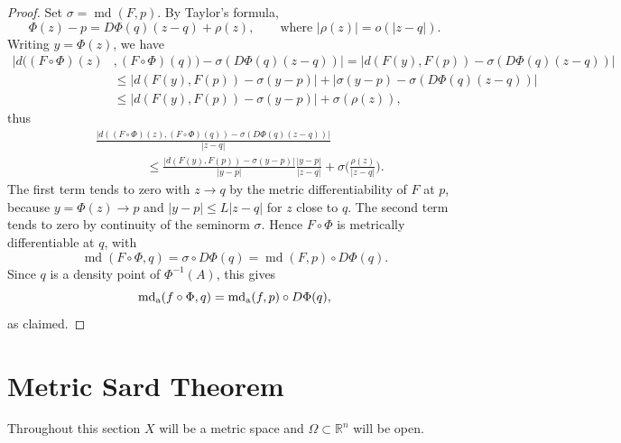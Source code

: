\documentclass[12pt,leqno]{amsart}
\theoremstyle{definition}
\newcommand{\bbbr}{\mathbb R}
\def\md{\operatorname{md}}
\def\apmd{\operatorname{md_{\rm a}}}
\numberwithin{theorem}{section} \numberwithin{equation}{section}
\begin{document}
\begin{proof}
Set $\sigma=\md(F,p)$. By Taylor's formula,
$$
\Phi(z)-p = D\Phi(q)(z-q)+\rho(z),
\qquad \text{where } |\rho(z)|=o(|z-q|).
$$
Writing $y=\Phi(z)$, we have
\begin{equation*}
\begin{split}
\left|\right. d((F\circ\Phi)(z)&,(F\circ\Phi)(q))
-\sigma(D\Phi(q)(z-q))\left.\right|  =
\left|
d(F(y),F(p))-\sigma(D\Phi(q)(z-q))
\right| \\
&\leq
\left|d(F(y),F(p))-\sigma(y-p)\right|+
\left|\sigma(y-p)-\sigma(D\Phi(q)(z-q))\right| \\
& \leq
\left|d(F(y),F(p))-\sigma(y-p)\right|+\sigma(\rho(z)),
\end{split}
\end{equation*}
thus
\begin{equation*}
\begin{split}
&\frac{\left|d((F\circ\Phi)(z),(F\circ\Phi)(q))
-\sigma(D\Phi(q)(z-q))
\right|}{|z-q|}\\
&\qquad\qquad\leq
\frac{
\left|
d(F(y),F(p))-\sigma(y-p)
\right|
}{|y-p|}
\frac{|y-p|}{|z-q|}
+\sigma\Big(\frac{\rho(z)}{|z-q|}\Big).
\end{split}
\end{equation*}
The first term tends to zero with $z\to q$ by the metric differentiability of $F$ at
$p$, because $y=\Phi(z)\to p$ and $|y-p|\leq L|z-q|$ for $z$ close to $q$.
The second term tends to zero by continuity of the seminorm $\sigma$. Hence $F\circ\Phi$ is metrically differentiable
at $q$, with
$$
\md(F\circ\Phi,q)=\sigma\circ D\Phi(q)
=\md(F,p)\circ D\Phi(q).
$$
Since $q$ is a density point of $\Phi^{-1}(A)$, this gives
$$
\apmd(f\circ \Phi,q)
=
\apmd(f,p)\circ D\Phi(q),
$$
as claimed.
\end{proof}



\section{Metric Sard Theorem}
\label{MST}
Throughout this section $X$ will be a metric space and $\Omega\subset\bbbr^n$ will be open.
\end{document}
